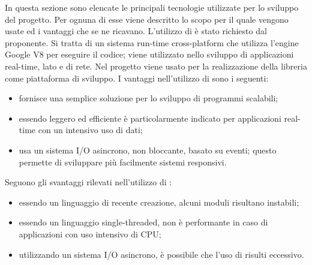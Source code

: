 In questa sezione sono elencate le principali tecnologie utilizzate per lo sviluppo del progetto. Per ognuna di esse viene descritto lo scopo per il quale vengono usate ed i vantaggi che se ne ricavano.
L'utilizzo di  è stato richiesto dal proponente. Si tratta di un sistema run-time cross-platform che utilizza l'engine Google V8  per eseguire il codice; viene utilizzato nello sviluppo di applicazioni real-time, lato  e di rete. Nel progetto viene usato per la realizzazione della libreria come piattaforma di sviluppo.
I vantaggi nell'utilizzo di  sono i seguenti:
\begin{itemize}
\item fornisce una semplice soluzione per lo sviluppo di programmi scalabili;
\item essendo leggero ed efficiente è particolarmente indicato per applicazioni real-time con un intensivo uso di dati;
\item usa un sistema I/O asincrono, non bloccante, basato su eventi; questo permette di sviluppare più facilmente sistemi responsivi.
\end{itemize}
Seguono gli svantaggi rilevati nell'utilizzo di :
\begin{itemize}
	\item essendo un linguaggio di recente creazione, alcuni moduli risultano instabili;
	\item essendo un linguaggio single-threaded, non è performante in caso di applicazioni con uso intensivo di CPU;
	\item utilizzando un sistema I/O asincrono, è possibile che l'uso di  risulti eccessivo.
\end{itemize}

